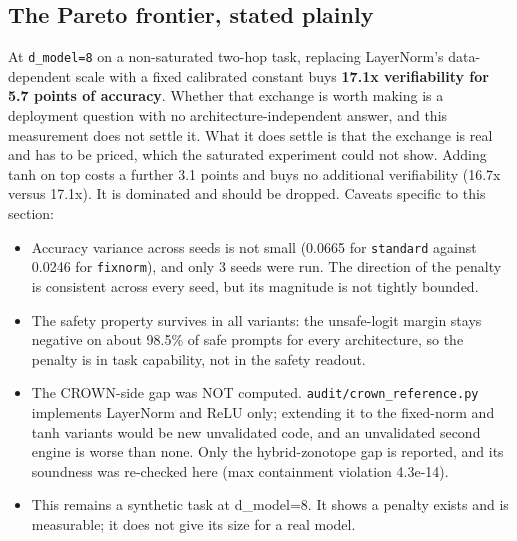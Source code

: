 \documentclass[sn-nature,pdflatex]{sn-jnl}
\begin{document}
\subsection{The Pareto frontier, stated plainly}
At \texttt{d\_model=8} on a non-saturated two-hop task, replacing LayerNorm's data-dependent scale with a fixed calibrated constant buys \textbf{17.1x verifiability for 5.7 points of accuracy}. Whether that exchange is worth making is a deployment question with no architecture-independent answer, and this measurement does not settle it. What it does settle is that the exchange is real and has to be priced, which the saturated experiment could not show.
Adding tanh on top costs a further 3.1 points and buys no additional verifiability (16.7x versus 17.1x). It is dominated and should be dropped.
Caveats specific to this section:
\begin{itemize}
\item Accuracy variance across seeds is not small (0.0665 for \texttt{standard} against 0.0246 for \texttt{fixnorm}), and only 3 seeds were run. The direction of the penalty is consistent across every seed, but its magnitude is not tightly bounded.
\item The safety property survives in all variants: the unsafe-logit margin stays negative on about 98.5\% of safe prompts for every architecture, so the penalty is in task capability, not in the safety readout.
\item The CROWN-side gap was NOT computed. \texttt{audit/crown\_reference.py} implements LayerNorm and ReLU only; extending it to the fixed-norm and tanh variants would be new unvalidated code, and an unvalidated second engine is worse than none. Only the hybrid-zonotope gap is reported, and its soundness was re-checked here (max containment violation 4.3e-14).
\item This remains a synthetic task at d\_model=8. It shows a penalty exists and is measurable; it does not give its size for a real model.
\end{itemize}
\end{document}
